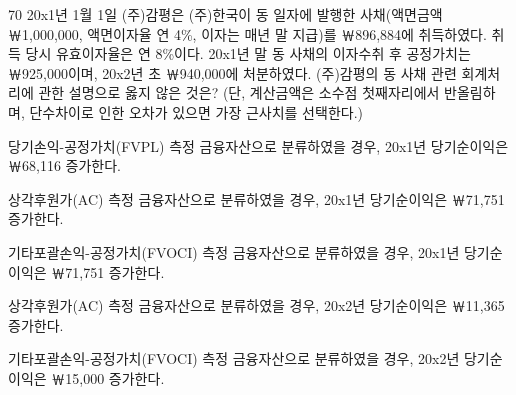 \begin{question}{70}
20x1년 1월 1일 (주)감평은 (주)한국이 동 일자에 발행한 사채(액면금액 ￦1,000,000, 액면이자율 연 4\%, 이자는 매년 말 지급)를 ￦896,884에 취득하였다. 취득 당시 유효이자율은 연 8\%이다. 20x1년 말 동 사채의 이자수취 후 공정가치는 ￦925,000이며, 20x2년 초 ￦940,000에 처분하였다. (주)감평의 동 사채 관련 회계처리에 관한 설명으로 옳지 않은 것은? (단, 계산금액은 소수점 첫째자리에서 반올림하며, 단수차이로 인한 오차가 있으면 가장 근사치를 선택한다.)
\begin{choices}
  \item 당기손익-공정가치(FVPL) 측정 금융자산으로 분류하였을 경우, 20x1년 당기순이익은 ￦68,116 증가한다.
  \item 상각후원가(AC) 측정 금융자산으로 분류하였을 경우, 20x1년 당기순이익은 ￦71,751 증가한다.
  \item 기타포괄손익-공정가치(FVOCI) 측정 금융자산으로 분류하였을 경우, 20x1년 당기순이익은 ￦71,751 증가한다.
  \item 상각후원가(AC) 측정 금융자산으로 분류하였을 경우, 20x2년 당기순이익은 ￦11,365 증가한다.
  \item 기타포괄손익-공정가치(FVOCI) 측정 금융자산으로 분류하였을 경우, 20x2년 당기순이익은 ￦15,000 증가한다.
\end{choices}
\end{question}
